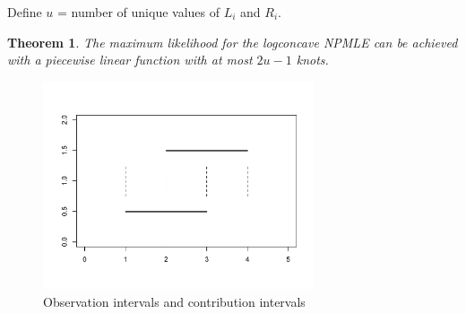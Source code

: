 \documentclass[12pt]{article}
\newtheorem{thm}{Theorem}
\numberwithin{equation}{section}
\begin{document}
	Define $u$ = number of unique values of $L_i$ and $R_i$. 

	\begin{thm}
	\label{thm1}
	The maximum likelihood for the logconcave NPMLE can be achieved with a piecewise linear function with at most $2u-1$ knots.
	\end{thm}
	
\begin{figure}[h]
\centerline{\includegraphics[width = 8cm]{ContrbInt.pdf} }
\caption{Observation intervals and contribution intervals}
\end{figure}	
\end{document}
